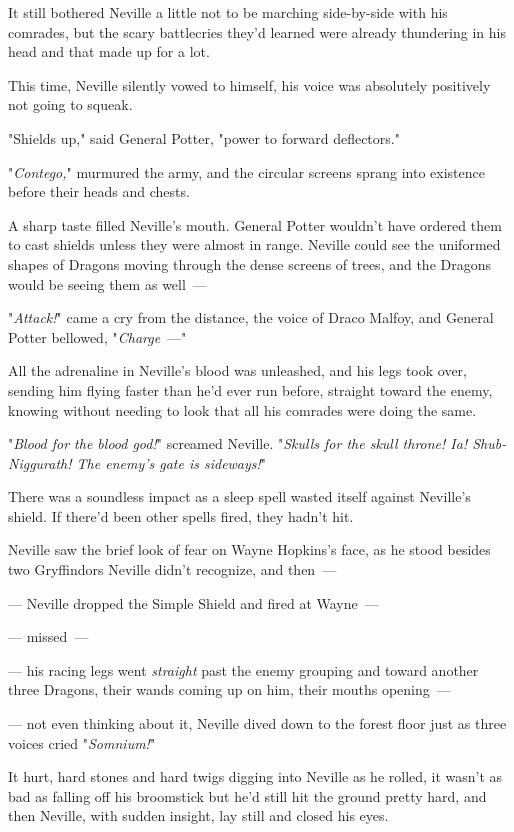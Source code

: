 It still bothered Neville a little not to be marching side-by-side with his
comrades, but the scary battlecries they'd learned were already thundering in
his head and that made up for a lot.

This time, Neville silently vowed to himself, his voice was absolutely
positively not going to squeak.

"Shields up," said General Potter, "power to forward deflectors."

"\emph{Contego,}" murmured the army, and the circular screens sprang into
existence before their heads and chests.

A sharp taste filled Neville's mouth. General Potter wouldn't have ordered them
to cast shields unless they were almost in range. Neville could see the
uniformed shapes of Dragons moving through the dense screens of trees, and the
Dragons would be seeing them as well~---

"\emph{Attack!}" came a cry from the distance, the voice of Draco Malfoy, and
General Potter bellowed, "\emph{Charge}~---"

All the adrenaline in Neville's blood was unleashed, and his legs took over,
sending him flying faster than he'd ever run before, straight toward the enemy,
knowing without needing to look that all his comrades were doing the same.

"\emph{Blood for the blood god!}" screamed Neville. "\emph{Skulls for the skull
throne! Ia! Shub-Niggurath! The enemy's gate is sideways!}"

There was a soundless impact as a sleep spell wasted itself against Neville's
shield. If there'd been other spells fired, they hadn't hit.

Neville saw the brief look of fear on Wayne Hopkins's face, as he stood besides
two Gryffindors Neville didn't recognize, and then~---

--- Neville dropped the Simple Shield and fired at Wayne~---

--- missed~---

--- his racing legs went \emph{straight} past the enemy grouping and toward
another three Dragons, their wands coming up on him, their mouths opening~---

--- not even thinking about it, Neville dived down to the forest floor just as
three voices cried "\emph{Somnium!}"

It hurt, hard stones and hard twigs digging into Neville as he rolled, it
wasn't as bad as falling off his broomstick but he'd still hit the ground
pretty hard, and then Neville, with sudden insight, lay still and closed his
eyes.

